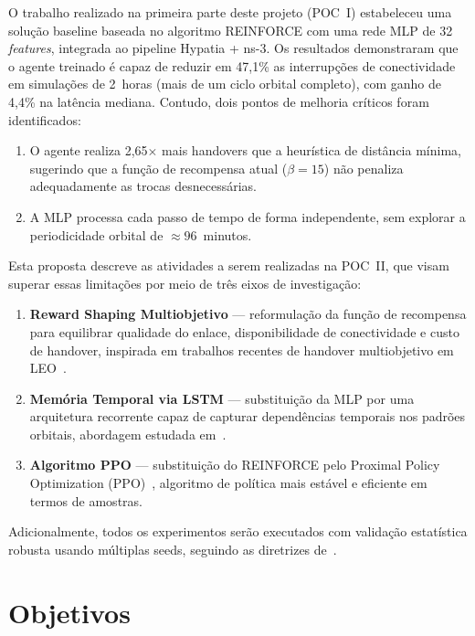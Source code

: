 \documentclass[12pt,a4paper]{article}
\begin{document}
O trabalho realizado na primeira parte deste projeto (POC~I) estabeleceu uma
solução baseline baseada no algoritmo REINFORCE com uma rede MLP de 32
\textit{features}, integrada ao pipeline Hypatia + ns-3. Os resultados
demonstraram que o agente treinado é capaz de reduzir em 47,1\% as
interrupções de conectividade em simulações de 2~horas (mais de um ciclo
orbital completo), com ganho de 4,4\% na latência mediana. Contudo, dois
pontos de melhoria críticos foram identificados:
\begin{enumerate}
  \item O agente realiza 2,65$\times$ mais handovers que a heurística de
        distância mínima, sugerindo que a função de recompensa atual
        ($\beta = 15$) não penaliza adequadamente as trocas desnecessárias.
  \item A MLP processa cada passo de tempo de forma independente, sem
        explorar a periodicidade orbital de $\approx 96$~minutos.
\end{enumerate}

Esta proposta descreve as atividades a serem realizadas na POC~II, que visam
superar essas limitações por meio de três eixos de investigação:
\begin{enumerate}[label=\textbf{\arabic*.}]
  \item \textbf{Reward Shaping Multiobjetivo} --- reformulação da função de
        recompensa para equilibrar qualidade do enlace, disponibilidade de
        conectividade e custo de handover, inspirada em trabalhos recentes de
        handover multiobjetivo em LEO~\cite{song2025}.
  \item \textbf{Memória Temporal via LSTM} --- substituição da MLP por uma
        arquitetura recorrente capaz de capturar dependências temporais nos
        padrões orbitais, abordagem estudada em~\cite{fan2025}.
  \item \textbf{Algoritmo PPO} --- substituição do REINFORCE pelo Proximal
        Policy Optimization (PPO)~\cite{schulman2017}, algoritmo de política
        mais estável e eficiente em termos de amostras.
\end{enumerate}

Adicionalmente, todos os experimentos serão executados com validação estatística
robusta usando múltiplas seeds, seguindo as diretrizes de~\cite{henderson2018}.

\section{Objetivos}
\end{document}

